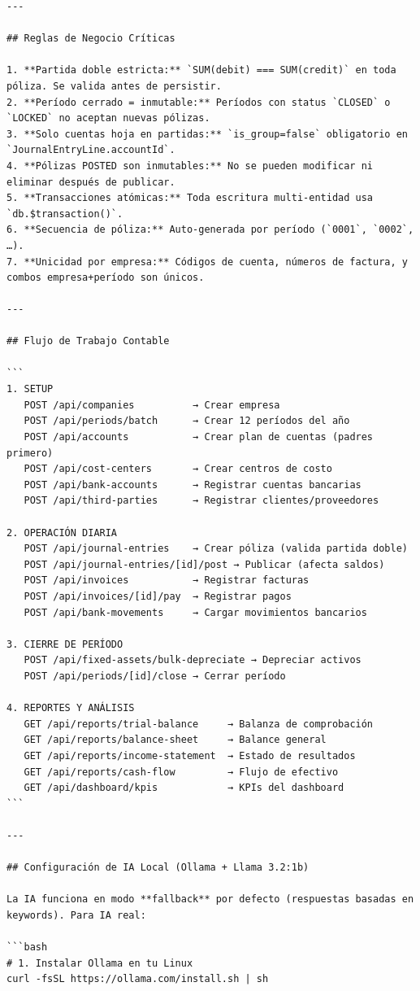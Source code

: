 \documentclass[12pt, a4paper, oneside]{book}
\begin{document}
\begin{lstlisting}
---

## Reglas de Negocio Críticas

1. **Partida doble estricta:** `SUM(debit) === SUM(credit)` en toda póliza. Se valida antes de persistir.
2. **Período cerrado = inmutable:** Períodos con status `CLOSED` o `LOCKED` no aceptan nuevas pólizas.
3. **Solo cuentas hoja en partidas:** `is_group=false` obligatorio en `JournalEntryLine.accountId`.
4. **Pólizas POSTED son inmutables:** No se pueden modificar ni eliminar después de publicar.
5. **Transacciones atómicas:** Toda escritura multi-entidad usa `db.$transaction()`.
6. **Secuencia de póliza:** Auto-generada por período (`0001`, `0002`, …).
7. **Unicidad por empresa:** Códigos de cuenta, números de factura, y combos empresa+período son únicos.

---

## Flujo de Trabajo Contable

```
1. SETUP
   POST /api/companies          → Crear empresa
   POST /api/periods/batch      → Crear 12 períodos del año
   POST /api/accounts           → Crear plan de cuentas (padres primero)
   POST /api/cost-centers       → Crear centros de costo
   POST /api/bank-accounts      → Registrar cuentas bancarias
   POST /api/third-parties      → Registrar clientes/proveedores

2. OPERACIÓN DIARIA
   POST /api/journal-entries    → Crear póliza (valida partida doble)
   POST /api/journal-entries/[id]/post → Publicar (afecta saldos)
   POST /api/invoices           → Registrar facturas
   POST /api/invoices/[id]/pay  → Registrar pagos
   POST /api/bank-movements     → Cargar movimientos bancarios

3. CIERRE DE PERÍODO
   POST /api/fixed-assets/bulk-depreciate → Depreciar activos
   POST /api/periods/[id]/close → Cerrar período

4. REPORTES Y ANÁLISIS
   GET /api/reports/trial-balance     → Balanza de comprobación
   GET /api/reports/balance-sheet     → Balance general
   GET /api/reports/income-statement  → Estado de resultados
   GET /api/reports/cash-flow         → Flujo de efectivo
   GET /api/dashboard/kpis            → KPIs del dashboard
```

---

## Configuración de IA Local (Ollama + Llama 3.2:1b)

La IA funciona en modo **fallback** por defecto (respuestas basadas en keywords). Para IA real:

```bash
# 1. Instalar Ollama en tu Linux
curl -fsSL https://ollama.com/install.sh | sh


\end{lstlisting}
\end{document}
